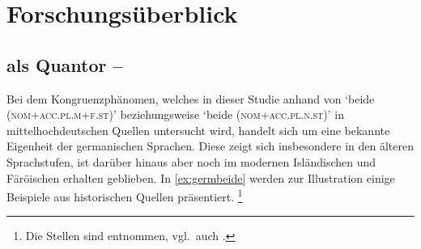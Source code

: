 \chapter{Forschungsüberblick}
\label{ch:forschungsueberblick}

\section%
	{ als Quantor -- }
\label{sec:ovwbeidequant}

Bei dem Kongruenzphänomen, welches in dieser Studie anhand von 
`beide (\textsc{nom+acc.​pl.​m+f.st})' beziehungsweise
 `beide (\textsc{nom+acc.pl.n.st})' in mittelhochdeutschen Quellen
untersucht wird, handelt sich um eine bekannte Eigenheit der germanischen
Sprachen. Diese zeigt sich insbesondere in den älteren Sprachstufen, ist
darüber hinaus aber noch im modernen Isländischen
\autocites[283]{corbett1991}[569]{wechsler2009} und Färöischen
\autocite[225--226]{thrainsson2004} erhalten geblieben. In \cref{ex:germbeide}
werden zur Illustration einige Beispiele aus historischen Quellen präsentiert.%
%
	\footnote{Die Stellen sind \citet[12]{askedal1973} entnommen, vgl.~auch
		\citet{hock2008,hock2009}.}

